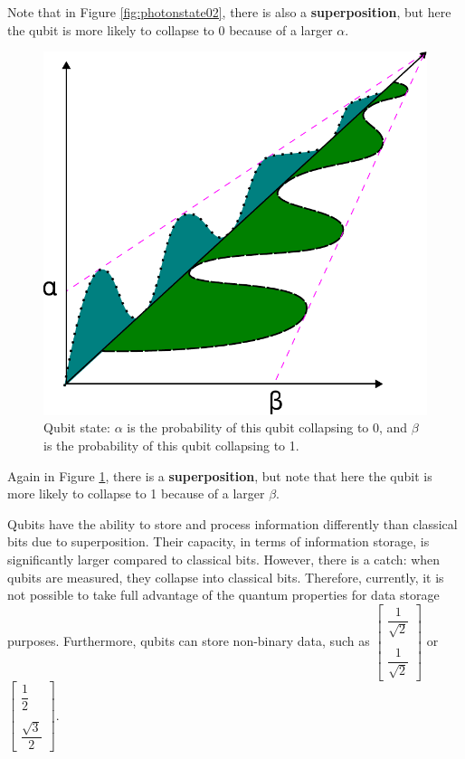 		\par Note that in Figure \ref{fig:photonstate02}, there is also a \textbf{superposition}, but here the qubit is more likely to collapse to 0 because of a larger $\alpha$.
		
		\begin{figure}[h]
			\centering
			\includegraphics[width=0.7\linewidth]{images/photonState03}
			\caption[Qubit state 3]{Qubit state: $\alpha$ is the probability of this qubit collapsing to 0, and $\beta$ is the probability of this qubit collapsing to 1.}
			\label{fig:photonstate03}
		\end{figure}
		
		\par Again in Figure \ref{fig:photonstate03}, there is a \textbf{superposition}, but note that here the qubit is more likely to collapse to 1 because of a larger $\beta$.\newline

		\par Qubits have the ability to store and process information differently than classical bits due to superposition. Their capacity, in terms of information storage, is significantly larger compared to classical bits. However, there is a catch: when qubits are measured, they collapse into classical bits. Therefore, currently, it is not possible to take full advantage of the quantum properties for data storage purposes. Furthermore, qubits can store non-binary data, such as $\begin{bmatrix} \dfrac{1}{\sqrt{2}} \\\\ \dfrac{1}{\sqrt{2}} \end{bmatrix}$ or $\begin{bmatrix} \dfrac{1}{2} \\\\ \dfrac{\sqrt{3}}{2} \end{bmatrix}$.\newline
		
